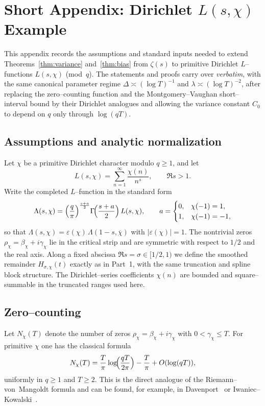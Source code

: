 \section{Short Appendix: Dirichlet \texorpdfstring{$L(s,\chi)$}{L(s,χ)} Example}
\label{app:dirichlet}

This appendix records the assumptions and standard inputs needed to extend
Theorems~\ref{thm:variance} and~\ref{thm:bias} from $\zeta(s)$ to primitive
Dirichlet $L$–functions $L(s,\chi)$ (mod~$q$). The statements and proofs
carry over \emph{verbatim}, with the same canonical parameter regime
$\Delta\asymp(\log T)^{-1}$ and $\lambda\asymp(\log T)^{-2}$, after replacing
the zero–counting function and the Montgomery–Vaughan short–interval bound by
their Dirichlet analogues and allowing the variance constant $C_0$ to depend
on $q$ only through $\log(qT)$.

\subsection*{Assumptions and analytic normalization}
Let $\chi$ be a primitive Dirichlet character modulo $q\ge 1$, and let
\[
L(s,\chi)=\sum_{n=1}^\infty \frac{\chi(n)}{n^s}, \qquad \Re s>1.
\]
Write the completed $L$–function in the standard form
\[
\Lambda(s,\chi)
=\Bigl(\frac{q}{\pi}\Bigr)^{\frac{s+a}{2}}
\Gamma\!\Bigl(\frac{s+a}{2}\Bigr)\,L(s,\chi),
\qquad
a=\begin{cases}
0,& \chi(-1)=1,\\
1,& \chi(-1)=-1,
\end{cases}
\]
so that $\Lambda(s,\chi)=\varepsilon(\chi)\,\Lambda(1-s,\overline\chi)$ with
$|\varepsilon(\chi)|=1$. The nontrivial zeros $\rho_\chi=\beta_\chi+i\gamma_\chi$
lie in the critical strip and are symmetric with respect to $1/2$ and the real axis.
Along a fixed abscissa $\Re s=\sigma\in[1/2,1)$ we define the smoothed remainder
$H_{\sigma,\chi}(t)$ exactly as in Part~1, with the same truncation and spline
block structure. The Dirichlet–series coefficients $\chi(n)$ are bounded and
square–summable in the truncated ranges used here.

\subsection*{Zero–counting}
Let $N_\chi(T)$ denote the number of zeros $\rho_\chi=\beta_\chi+i\gamma_\chi$
with $0<\gamma_\chi\le T$. For primitive $\chi$ one has the classical formula
\begin{equation}
N_\chi(T)
=\frac{T}{\pi}\log\!\Bigl(\frac{qT}{2\pi}\Bigr)-\frac{T}{\pi}
+O(\log(qT)),
\label{eq:Nchi}
\end{equation}
uniformly in $q\ge 1$ and $T\ge 2$.
This is the direct analogue of the Riemann–von~Mangoldt formula and can be found,
for example, in Davenport~\cite[Ch.~16]{davenport} or Iwaniec–Kowalski~\cite{iwaniec-kowalski}.

